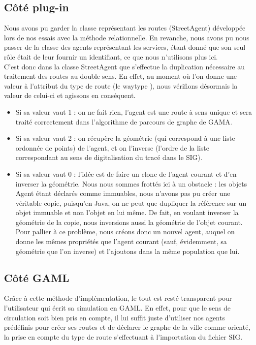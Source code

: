 \documentclass[11pt]{report} %
\begin{document}
\subsection{Côt\'e plug-in}
Nous avons pu garder la classe repr\'esentant les routes (StreetAgent) d\'evelopp\'ee lors de nos essais avec la m\'ethode relationnelle. En revanche, nous avons pu nous passer de la classe des agents repr\'esentant les services, \'etant donn\'e que son seul rôle \'etait de leur fournir un identifiant, ce que nous n'utilisons plus ici.\\
C'est donc dans la classe StreetAgent que s'effectue la duplication n\'ecessaire au traitement des routes au double sens. En effet, au moment o\`u l'on donne une valeur \`a l'attribut du type de route (le \og waytype \fg{}), nous v\'erifions d\'esormais la valeur de celui-ci et agissons en cons\'equent.
\begin{itemize}
 \item Si sa valeur vaut 1 : on ne fait rien, l'agent est une route \`a sens unique et sera trait\'e correctement dans l'algorithme de parcours de graphe de GAMA.
 \item Si sa valeur vaut 2 : on r\'ecup\`ere la g\'eom\'etrie (qui correspond \`a une liste ordonn\'ee de points) de l'agent, et on l'inverse (l'ordre de la liste correspondant au sens de digitalisation du trac\'e dans le SIG).
 \item Si sa valeur vaut 0 : l'id\'ee est de faire un clone de l'agent courant et d'en inverser la g\'eom\'etrie. Nous nous sommes frott\'es ici \`a un obstacle : les objets \og Agent \fg{} \'etant d\'eclar\'es comme immuables, nous n'avons pas pu cr\'eer une v\'eritable copie, puisqu'en Java, on ne peut que dupliquer la r\'ef\'erence sur un objet immuable et non l'objet en lui m\^eme. De fait, en voulant inverser la g\'eom\'etrie de la copie, nous inversions aussi la g\'eom\'etrie de l'objet courant. Pour pallier \`a ce probl\`eme, nous cr\'eons donc un nouvel agent, auquel on donne les m\^emes propri\'et\'es que l'agent courant (sauf, \'evidemment, sa g\'eom\'etrie que l'on inverse) et l'ajoutons dans la m\^eme population que lui.
\end{itemize}

\subsection{Côt\'e GAML}
Grâce \`a cette m\'ethode d'impl\'ementation, le tout est rest\'e transparent pour l'utilisateur qui \'ecrit sa simulation en GAML. En effet, pour que le sens de circulation soit bien pris en compte, il lui suffit juste d'utiliser nos agents pr\'ed\'efinis pour cr\'eer ses routes et de d\'eclarer le graphe de la ville comme orient\'e, la prise en compte du type de route s'effectuant \`a l'importation du fichier SIG.
\end{document}
